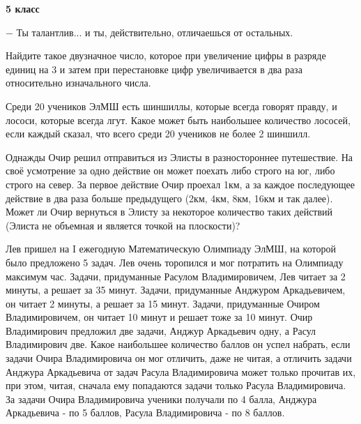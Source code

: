 \hspace{3mm}

\centerline{\bf \huge 5 класс}

\hspace{3mm}
\begin{flushright}
    \scriptsize{$-$ Ты талантлив... и ты, действительно, отличаешься от остальных.}
\end{flushright}

Найдите такое двузначное число, которое при увеличение цифры в разряде единиц на 3 и затем при перестановке цифр увеличивается в два раза относительно изначального числа.

\hspace{3mm}

 Среди 20 учеников ЭлМШ есть шиншиллы, которые всегда говорят правду, и лососи, которые всегда лгут. Какое может быть наибольшее количество лососей, если каждый сказал, что всего среди 20 учеников не более 2 шиншилл.

\hspace{3mm}

 Однажды Очир решил отправиться из Элисты в разностороннее путешествие. На своё усмотрение за одно действие он может поехать либо строго на юг, либо строго на север. За первое действие Очир проехал 1км, а за каждое последующее действие в два раза больше предыдущего (2км, 4км, 8км, 16км и так далее). Может ли Очир вернуться в Элисту за некоторое количество таких действий (Элиста не объемная и является точкой на плоскости)?

\hspace{3mm}

 Лев пришел на I ежегодную Математическую Олимпиаду ЭлМШ, на которой было предложено 5 задач. Лев очень торопился и мог потратить на Олимпиаду максимум час. Задачи, придуманные Расулом Владимировичем, Лев читает за 2 минуты, а решает за 35 минут. Задачи, придуманные Анджуром Аркадьевичем, он читает 2 минуты, а решает за 15 минут. Задачи, придуманные Очиром Владимировичем, он читает 10 минут и решает тоже за 10 минут. Очир Владимирович предложил две задачи, Анджур Аркадьевич одну, а Расул Владимирович две. Какое наибольшее количество баллов он успел набрать, если задачи Очира Владимировича он мог отличить, даже не читая, а отличить задачи Анджура Аркадьевича от задач Расула Владимировича может только прочитав их, при этом, читая, сначала ему попадаются задачи только Расула Владимировича. За задачи Очира Владимировича ученики получали по 4 балла, Анджура Аркадьевича - по 5 баллов, Расула Владимировича - по 8 баллов.

